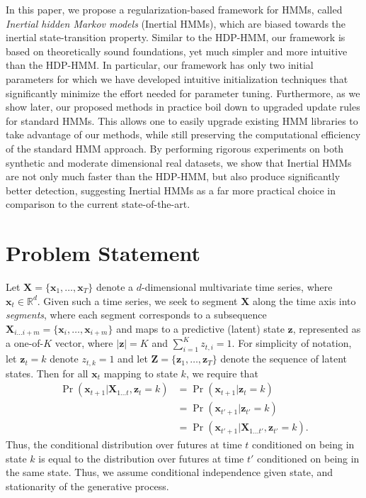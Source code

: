 \documentclass[letterpaper]{article}
\begin{document}
In this paper, we propose a regularization-based framework for HMMs, called
\emph{Inertial hidden Markov models} (Inertial HMMs), which are biased towards the inertial 
state-transition property. Similar to the HDP-HMM, our framework is based on 
theoretically sound foundations, yet much simpler and more intuitive than the HDP-HMM. 
In particular, our framework has only two initial parameters for which we have 
developed intuitive initialization techniques that significantly minimize the effort 
needed for parameter tuning. Furthermore, as we show later, our proposed
methods in practice boil down to upgraded update rules for standard HMMs. This allows one to easily 
upgrade existing HMM libraries to take advantage of our methods, while still preserving the
computational efficiency of the standard HMM approach. By performing rigorous
experiments on both synthetic and moderate dimensional real datasets, we show
that Inertial HMMs are not only much faster than the HDP-HMM, but also produce 
significantly better detection, suggesting Inertial HMMs as a far more practical 
choice in comparison to the current state-of-the-art.

\section{Problem Statement}

Let $\mathbf{X} = \{\mathbf{x}_1, \ldots, \mathbf{x}_T\}$ denote a
$d$-dimensional multivariate time series, where $\mathbf{x}_t \in \mathbb{R}^d$.
Given such a time series, we seek to segment $\mathbf{X}$ along the time axis
into \emph{segments}, where each segment corresponds to a subsequence
$\mathbf{X}_{i\ldots i+m} = \{\mathbf{x}_i, \ldots, \mathbf{x}_{i+m}\}$ and maps
to a predictive (latent) state $\mathbf{z}$, represented as a one-of-$K$ vector,
where $|\mathbf{z}| = K$ and $\sum_{i=1}^{K}z_{t,i} = 1$. For simplicity of
notation, let $\mathbf{z}_{t} = k$ denote $z_{t,k} = 1$ and let $\mathbf{Z} =
\{\mathbf{z}_1, \ldots, \mathbf{z}_T\}$ denote the sequence of latent states.
Then for all $\mathbf{x}_{t}$ mapping to state $k$, we require that
\begin{align*}
    \Pr(\mathbf{x}_{t+1}|\mathbf{X}_{1\ldots t}, \mathbf{z}_t = k) 
    &= \Pr(\mathbf{x}_{t+1}| \mathbf{z}_t = k) \\
    &= \Pr(\mathbf{x}_{t'+1}| \mathbf{z}_{t'} = k) \\
    &= \Pr(\mathbf{x}_{t'+1}| \mathbf{X}_{1\ldots t'}, \mathbf{z}_{t'} = k).
\end{align*}
Thus, the conditional distribution over futures at time $t$ conditioned on being
in state $k$ is equal to the distribution over futures at time $t'$ conditioned
on being in the same state. Thus, we assume conditional independence given
state, and stationarity of the generative process.
\end{document}
